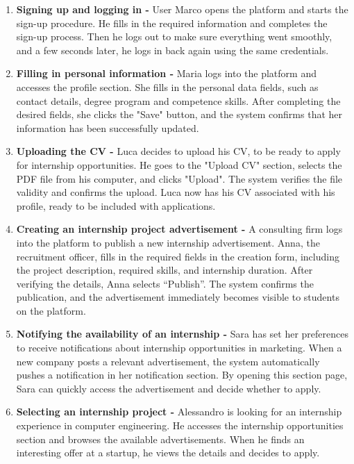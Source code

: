 \begin{enumerate}[label=\textbf{S\arabic* -}]
    \item \textbf{Signing up and logging in -}
    User Marco opens the platform and starts the sign-up procedure.
    He fills in the required information and completes the sign-up process.
    Then he logs out to make sure everything went smoothly, and a few seconds later, he logs in back again using the same credentials.
    \item \textbf{Filling in personal information -}
    Maria logs into the platform and accesses the profile section.
    She fills in the personal data fields, such as contact details, degree program and competence skills.
    After completing the desired fields, she clicks the "Save" button, and the system confirms that her information has been successfully updated.
    \item \textbf{Uploading the CV -}
    Luca decides to upload his CV, to be ready to apply for internship opportunities.
    He goes to the "Upload CV" section, selects the PDF file from his computer, and clicks "Upload".
    The system verifies the file validity and confirms the upload.
    Luca now has his CV associated with his profile, ready to be included with applications.
    \item \textbf{Creating an internship project advertisement -}
    A consulting firm logs into the platform to publish a new internship advertisement.
    Anna, the recruitment officer, fills in the required fields in the creation form, including the project description, required skills, and internship duration.
    After verifying the details, Anna selects “Publish”.
    The system confirms the publication, and the advertisement immediately becomes visible to students on the platform.
    \item \textbf{Notifying the availability of an internship -}
    Sara has set her preferences to receive notifications about internship opportunities in marketing.
    When a new company posts a relevant advertisement, the system automatically pushes a notification in her notification section.
    By opening this section page, Sara can quickly access the advertisement and decide whether to apply.
    \item \textbf{Selecting an internship project -}
    Alessandro is looking for an internship experience in computer engineering.
    He accesses the internship opportunities section and browses the available advertisements.
    When he finds an interesting offer at a startup, he views the details and decides to apply.

\end{enumerate}
